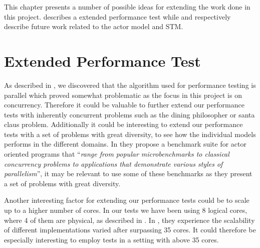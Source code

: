 \makeatletter {}\makeatother
{}
This chapter presents a number of possible ideas for extending the work done in this project.  describes a extended performance test while  and  respectively describe future work related to the actor model and \ac{STM}.
\section{Extended Performance Test}
\label{sec:extended_performance_test}
As described in , we discovered that the algorithm used for performance testing is parallel which proved somewhat problematic as the focus in this project is on concurrency. Therefore it could be valuable to further extend our performance tests with inherently concurrent problems such as the dining philosopher or santa claus problem. Additionally it could be interesting to extend our performance tests with a set of problems with great diversity, to see how the individual models performs in the different domains. In \cite{imam2014savina} they propose a benchmark suite for actor oriented programs that ``\textit{range from popular microbenchmarks to classical concurrency problems to applications that demonstrate various styles of parallelism}'', it may be relevant to use some of these benchmarks as they present a set of problems with great diversity.

Another interesting factor for extending our performance tests could be to scale up to a higher number of cores. In our tests we have been using 8 logical cores, where 4 of them are physical, as described in . In \cite{harris2003language}, they experience the scalability of different implementations varied after surpassing 35 cores. It could therefore be especially interesting to employ tests in a setting with above 35 cores.


